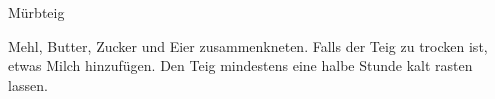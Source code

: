 \begin{recipe}[\vegetarian]{Mürbteig}
    \label{murbteig}%

    \begin{ingredients}
    \end{ingredients}

    \begin{instructions}
        Mehl, Butter, Zucker und Eier zusammenkneten.
        Falls der Teig zu trocken ist, etwas Milch hinzufügen.
        Den Teig mindestens eine halbe Stunde kalt rasten lassen.
    \end{instructions}
\end{recipe}
